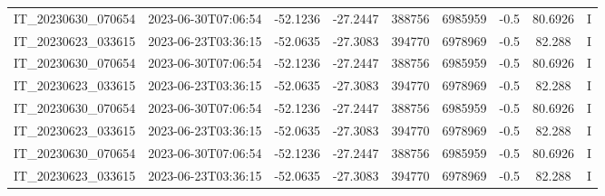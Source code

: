 \begin{small}
\begin{longtable}{ccccccccc}
IT\_20230630\_070654 & 2023-06-30T07:06:54 & -52.1236 & -27.2447 & 388756 & 6985959 & -0.5 & \num[round-precision=3,round-mode=figures,scientific-notation=true]{80.6926} & I \\
IT\_20230623\_033615 & 2023-06-23T03:36:15 & -52.0635 & -27.3083 & 394770 & 6978969 & -0.5 & \num[round-precision=3,round-mode=figures,scientific-notation=true]{82.288} & I \\
IT\_20230630\_070654 & 2023-06-30T07:06:54 & -52.1236 & -27.2447 & 388756 & 6985959 & -0.5 & \num[round-precision=3,round-mode=figures,scientific-notation=true]{80.6926} & I \\
IT\_20230623\_033615 & 2023-06-23T03:36:15 & -52.0635 & -27.3083 & 394770 & 6978969 & -0.5 & \num[round-precision=3,round-mode=figures,scientific-notation=true]{82.288} & I \\
IT\_20230630\_070654 & 2023-06-30T07:06:54 & -52.1236 & -27.2447 & 388756 & 6985959 & -0.5 & \num[round-precision=3,round-mode=figures,scientific-notation=true]{80.6926} & I \\
IT\_20230623\_033615 & 2023-06-23T03:36:15 & -52.0635 & -27.3083 & 394770 & 6978969 & -0.5 & \num[round-precision=3,round-mode=figures,scientific-notation=true]{82.288} & I \\
IT\_20230630\_070654 & 2023-06-30T07:06:54 & -52.1236 & -27.2447 & 388756 & 6985959 & -0.5 & \num[round-precision=3,round-mode=figures,scientific-notation=true]{80.6926} & I \\
IT\_20230623\_033615 & 2023-06-23T03:36:15 & -52.0635 & -27.3083 & 394770 & 6978969 & -0.5 & \num[round-precision=3,round-mode=figures,scientific-notation=true]{82.288} & I \\

\end{longtable}
\end{small}
%

